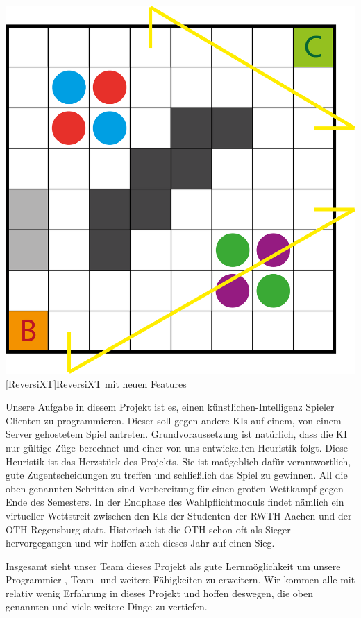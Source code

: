 \documentclass[12pt,a4paper,bibliography=totocnumbered,listof=totocnumbered]{scrartcl}
\begin{document}
    \vspace{1em}
    \begin{minipage}{\linewidth}
    	\centering
    	\includegraphics[width=0.6\linewidth]{pics/Kapitel_1/Kapitel_1_pic2.png}
    	[ReversiXT]{ReversiXT mit neuen Features}
    	\label{fig:ReversiXT}
    \end{minipage}
   	\vspace{1em}

    Unsere Aufgabe in diesem Projekt ist es, einen künstlichen-Intelligenz Spieler Clienten zu programmieren. Dieser soll gegen andere KIs auf einem, von einem Server gehostetem Spiel antreten. Grundvoraussetzung ist natürlich, dass die KI nur gültige Züge berechnet und einer von uns entwickelten Heuristik folgt. Diese Heuristik ist das Herzstück des Projekts. Sie ist maßgeblich dafür verantwortlich, gute Zugentscheidungen zu treffen und schließlich das Spiel zu gewinnen. All die oben genannten Schritten sind Vorbereitung für einen großen Wettkampf gegen Ende des Semesters. In der Endphase des Wahlpflichtmoduls findet nämlich ein virtueller Wettstreit zwischen den KIs der Studenten der RWTH Aachen und der OTH Regensburg statt. Historisch ist die OTH schon oft als Sieger hervorgegangen und wir hoffen auch dieses Jahr auf einen Sieg.

    Insgesamt sieht unser Team dieses Projekt als gute Lernmöglichkeit um unsere Programmier-, Team- und weitere Fähigkeiten zu erweitern. Wir kommen alle mit relativ wenig Erfahrung in dieses Projekt und hoffen deswegen, die oben genannten und viele weitere Dinge zu vertiefen.

\end{document}
